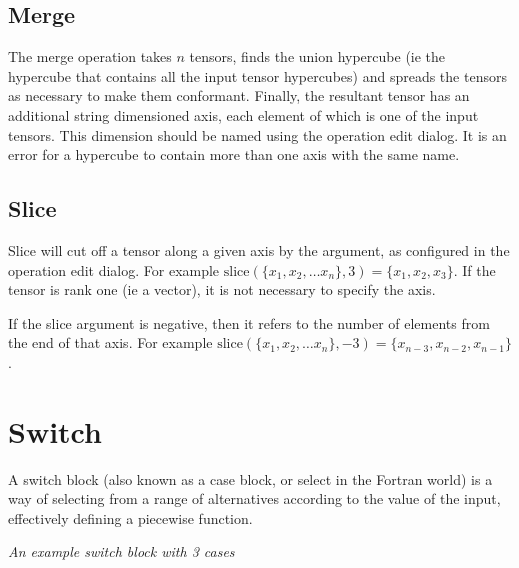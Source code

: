 \subsection{Merge}\label{Operation:merge}

The merge operation takes $n$ tensors, finds the union hypercube (ie
the hypercube that contains all the input tensor hypercubes) and
spreads the tensors as necessary to make them conformant. Finally,
the resultant tensor has an additional string dimensioned axis, each
element of which is one of the input tensors. This dimension should be
named using the operation edit dialog. It is an error for a hypercube
to contain more than one axis with the same name.

\subsection{Slice}\label{Operation:slice}

Slice will cut off a tensor along a given axis by the argument, as
configured in the operation edit dialog. For
example $\mathrm{slice}(\{x_1,x_2,\ldots x_n\},
  3)=\{x_1,x_2,x_3\}$. If the tensor is rank one (ie a vector), it is
  not necessary to specify the axis.

If the slice argument is negative, then it refers to the number of
elements from the end of that axis. For example $\mathrm{slice}(\{x_1,x_2,\ldots x_n\},
  -3)=\{x_{n-3},x_{n-2},x_{n-1}\}$.
  
\section{Switch}\label{SwitchIcon}

 A switch block (also known as a case
block, or select in the Fortran world) is a way of selecting from a
range of alternatives according to the value of the input, effectively
defining a piecewise function.

\begin{center}
   {\em
    An example switch block with 3 cases}
\end{center}

